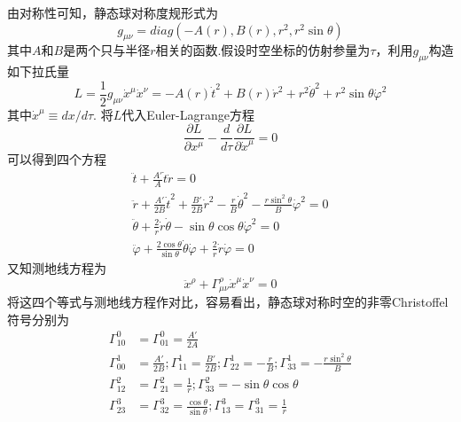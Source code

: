         由对称性可知，静态球对称度规形式为
        \begin{equation}
            g_{\mu\nu}=diag\left(-A(r),B(r),r^2,r^2\sin\theta\right)
        \end{equation}
        其中$A$和$B$是两个只与半径$r$相关的函数.假设时空坐标的仿射参量为$\tau$，利用$g_{\mu\nu}$构造如下拉氏量
        \begin{equation}
            L=\frac{1}{2}g_{\mu\nu}\dot{x}^\mu\dot{x}^\nu=-A(r)\dot{t}^2+B(r)\dot{r}^2+r^2\dot{\theta}^2+r^2\sin\theta\dot{\varphi}^2
        \end{equation}
        其中$\dot{x}^\mu\equiv dx/d\tau$.
        将$L$代入Euler-Lagrange方程
        \begin{equation}
            \frac{\partial L}{\partial x^\mu}-\frac{d}{d\tau}\frac{\partial L}{\partial \dot{x}^\mu}=0
        \end{equation}
        可以得到四个方程
        \begin{eqnarray*}
            \ddot{t}+\frac{A'}{A}\dot{t}\dot{r}=0\\
            \ddot{r}+\frac{A'}{2B}\dot{t}^2+\frac{B'}{2B}\dot{r}^2-\frac{r}{B}\dot{\theta}^2-\frac{r\sin^2\theta}{B}\dot{\varphi}^2=0\\
            \ddot{\theta}+\frac{2}{r}\dot{r}\dot{\theta}-\sin\theta \cos\theta\dot{\varphi}^2=0\\
            \ddot{\varphi}+\frac{2\cos\theta}{\sin\theta}\dot{\theta}\dot{\varphi}+\frac{2}{r}\dot{r}\dot{\varphi}=0
        \end{eqnarray*}
        又知测地线方程为
        \begin{equation}
            \ddot{x}^\rho+\Gamma^\rho_{\mu\nu}\dot{x}^\mu\dot{x}^\nu=0
        \end{equation}
        将这四个等式与测地线方程作对比，容易看出，静态球对称时空的非零Christoffel符号分别为
        \begin{equation}
            \begin{split}
                    \Gamma^0_{10}&=\Gamma^0_{01}=\frac{A'}{2A}\\
                    \Gamma^1_{00}&=\frac{A'}{2B};\Gamma^1_{11}=\frac{B'}{2B};\Gamma^1_{22}=-\frac{r}{B};\Gamma^1_{33}=-\frac{r\sin^2\theta}{B}\\
                    \Gamma^2_{12}&=\Gamma^2_{21}=\frac{1}{r};\Gamma^2_{33}=-\sin\theta \cos\theta\\
                    \Gamma^3_{23}&=\Gamma^3_{32}=\frac{\cos\theta}{\sin\theta};\Gamma^3_{13}=\Gamma^3_{31}=\frac{1}{r}
            \end{split}
        \end{equation}
        

